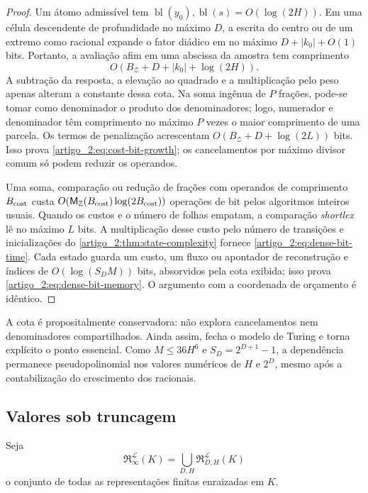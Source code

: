 \documentclass[12pt,a4paper]{article}
\theoremstyle{preciso}
\theoremstyle{definition}
\newcommand{\Library}{\mathcal{L}}
\newcommand{\Representations}{\mathfrak{R}}
\theoremstyle{preciso}
\theoremstyle{preciso}
\theoremstyle{preciso}
\theoremstyle{preciso}
\theoremstyle{definition}
\theoremstyle{preciso}
\theoremstyle{definition}
\theoremstyle{preciso}
\theoremstyle{preciso}
\theoremstyle{definition}
\newcounter{absc}
\begin{document}
\begin{proof}
Um átomo admissível tem $\operatorname{bl}(y_0),
\operatorname{bl}(s)=O(\log(2H))$. Em uma célula descendente de profundidade
no máximo $D$, a escrita do centro ou de um extremo como racional expande o fator
diádico em no máximo $D+|k_0|+O(1)$ bits. Portanto, a avaliação afim em uma
abscissa da amostra tem comprimento
\[
 O(B_{\mathcal Z}+D+|k_0|+\log(2H)).
\]
A subtração da resposta, a elevação ao quadrado e a multiplicação pelo peso apenas alteram
a constante dessa cota. Na soma ingênua de $P$ frações, pode-se tomar como
denominador o produto dos denominadores; logo, numerador e denominador têm
comprimento no máximo $P$ vezes o maior comprimento de uma parcela. Os termos
de penalização acrescentam $O(B_{\mathcal Z}+D+\log(2L))$ bits. Isso prova
\eqref{artigo_2:eq:cost-bit-growth}; os cancelamentos por máximo divisor comum só podem
reduzir os operandos.

Uma soma, comparação ou redução de frações com operandos de comprimento
$B_{\rm cost}$ custa
$O(\mathsf M_{\mathbb Z}(B_{\rm cost})\log(2B_{\rm cost}))$ operações de bit
pelos algoritmos inteiros usuais. Quando os custos e o número de folhas empatam, a
comparação \emph{shortlex} lê no máximo $L$ bits. A multiplicação desse custo pelo número
de transições e inicializações do \cref{artigo_2:thm:state-complexity} fornece
\eqref{artigo_2:eq:dense-bit-time}. Cada estado guarda um custo, um fluxo ou apontador
de reconstrução e índices de $O(\log(S_DM))$ bits, absorvidos pela cota exibida;
isso prova \eqref{artigo_2:eq:dense-bit-memory}. O argumento com a coordenada de
orçamento é idêntico.
\end{proof}

A cota é propositalmente conservadora: não explora cancelamentos nem
denominadores compartilhados. Ainda assim, fecha o modelo de Turing e torna
explícito o ponto essencial. Como $M\le36H^6$ e $S_D=2^{D+1}-1$, a
dependência permanece pseudopolinomial nos valores numéricos de $H$ e $2^D$,
mesmo após a contabilização do crescimento dos racionais.

\subsection{Valores sob truncagem}

Seja
\[
 \Representations_{\infty}^{\Library}(K)
 =\bigcup_{D,H}\Representations_{D,H}^{\Library}(K)
\]
o conjunto de todas as representações finitas enraizadas em $K$.
\end{document}
